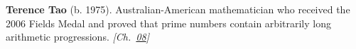 \textbf{Terence Tao} (b. 1975). Australian-American mathematician who received the 2006 Fields Medal and proved that prime numbers contain arbitrarily long arithmetic progressions. \emph{[Ch.~\hyperref[ch:boundedprimegaps]{08}]}

